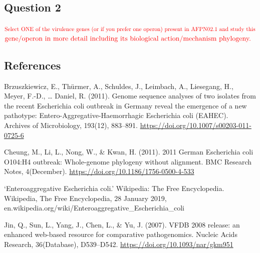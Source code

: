 \documentclass[]{article}
\begin{document}
\subsection{Question 2}\label{question-2}

\(\color{red}{\text{Select ONE of the virulence genes (or if you prefer one operon) present in AFPN02.1
and study this}}\)
\(\color{red}{\text{gene/operon in more detail including its biological action/mechanism phylogeny.}}\)

\subsection{References}\label{references}

Brzuszkiewicz, E., Thürmer, A., Schuldes, J., Leimbach, A., Liesegang,
H., Meyer, F.-D., \ldots{} Daniel, R. (2011). Genome sequence analyses
of two isolates from the recent Escherichia coli outbreak in Germany
reveal the emergence of a new pathotype: Entero-Aggregative-Haemorrhagic
Escherichia coli (EAHEC). Archives of Microbiology, 193(12), 883--891.
\url{https://doi.org/10.1007/s00203-011-0725-6}

Cheung, M., Li, L., Nong, W., \& Kwan, H. (2011). 2011 German
Escherichia coli O104:H4 outbreak: Whole-genome phylogeny without
alignment. BMC Research Notes, 4(December).
\url{https://doi.org/10.1186/1756-0500-4-533}

`Enteroaggregative Escherichia coli.' Wikipedia: The Free Encyclopedia.
Wikipedia, The Free Encyclopedia, 28 January 2019,
en.wikipedia.org/wiki/Enteroaggregative\_Escherichia\_coli

Jin, Q., Sun, L., Yang, J., Chen, L., \& Yu, J. (2007). VFDB 2008
release: an enhanced web-based resource for comparative pathogenomics.
Nucleic Acids Research, 36(Database), D539--D542.
\url{https://doi.org/10.1093/nar/gkm951}
\end{document}
